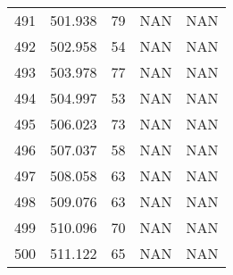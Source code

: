 \documentclass{article}
\begin{document}
\begin{longtable}{@{}lllll@{}}
				491 & 501.938 & 79    & NAN   & NAN   \\
				492 & 502.958 & 54    & NAN   & NAN   \\
				493 & 503.978 & 77    & NAN   & NAN   \\
				494 & 504.997 & 53    & NAN   & NAN   \\
				495 & 506.023 & 73    & NAN   & NAN   \\
				496 & 507.037 & 58    & NAN   & NAN   \\
				497 & 508.058 & 63    & NAN   & NAN   \\
				498 & 509.076 & 63    & NAN   & NAN   \\
				499 & 510.096 & 70    & NAN   & NAN   \\
				500 & 511.122 & 65    & NAN   & NAN   \\* \bottomrule
			\end{longtable}
			\newpage
		
\end{document}
